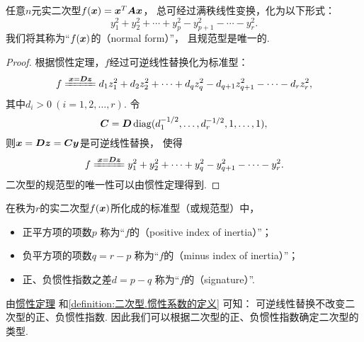 \begin{corollary}
任意\(n\)元实二次型\(f(\boldsymbol{x}) = \boldsymbol{x}^T\boldsymbol{A}\boldsymbol{x}\)，
总可经过满秩线性变换，化为以下形式：\begin{equation*}
	y_1^2+y_2^2+ \dotsb +y_p^2
	-y_{p+1}^2-\dotsb-y_r^2.
\end{equation*}
我们将其称为“\(f(\boldsymbol{x})\)的（{\rm normal form}）”，
且规范型是唯一的.
\begin{proof}
根据惯性定理，\(f\)经过可逆线性替换化为标准型：\begin{equation*}
	f \xlongequal{\vb{x}=\vb{D}\vb{z}}
	d_1 z_1^2 + d_2 z_2^2 + \dotsb + d_q z_q^2 - d_{q+1} z_{q+1}^2 - \dotsb - d_r z_r^2,
\end{equation*}
其中\(d_i>0\ (i=1,2,\dotsc,r)\).
令\begin{equation*}
	\boldsymbol{C} = \boldsymbol{D} \operatorname{diag}(d_1^{-1/2},\dotsc,d_r^{-1/2},1,\dotsc,1),
\end{equation*}
则\(\boldsymbol{x} = \boldsymbol{D}\boldsymbol{z} = \boldsymbol{C}\boldsymbol{y}\)是可逆线性替换，
使得\begin{equation*}
	f \xlongequal{\vb{x}=\vb{D}\vb{z}} y_1^2 + y_2^2 + \dotsb + y_q^2 - y_{q+1}^2 - \dotsb - y_r^2.
\end{equation*}
二次型的规范型的唯一性可以由惯性定理得到.
\end{proof}
\end{corollary}

\begin{definition}\label{definition:二次型.惯性系数的定义}
在秩为\(r\)的实二次型\(f(\boldsymbol{x})\)所化成的标准型（或规范型）中，
\begin{itemize}
	\item 正平方项的项数\(p\)
	称为“\(f\)的（positive index of inertia）”；
	\item 负平方项的项数\(q=r-p\)
	称为“\(f\)的（minus index of inertia）”；
	\item 正、负惯性指数之差\(d=p-q\)
	称为“\(f\)的（signature）”.
\end{itemize}
\end{definition}
由\hyperref[theorem:二次型.惯性定理]{惯性定理}%
和\cref{definition:二次型.惯性系数的定义} 可知：
可逆线性替换不改变二次型的正、负惯性指数.
因此我们可以根据二次型的正、负惯性指数确定二次型的类型.

